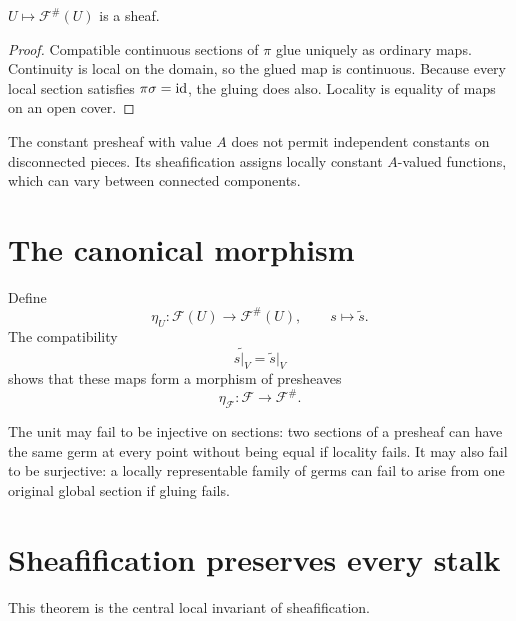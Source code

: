 

\begin{theorem}
$U\mapsto\mathcal F^\#(U)$ is a sheaf.
\end{theorem}
\begin{proof}
Compatible continuous sections of $\pi$ glue uniquely as ordinary maps.  Continuity is local
on the domain, so the glued map is continuous.  Because every local section satisfies
$\pi\sigma=\operatorname{id}$, the gluing does also.  Locality is equality of maps on an open cover.
\end{proof}

\begin{example}\label{ex:vi14-expand-01}
The constant presheaf with value $A$ does not permit independent constants on disconnected pieces.  Its sheafification assigns locally constant $A$-valued functions, which can vary between connected components.
\end{example}
\section{The canonical morphism}

Define
\[
\eta_U:\mathcal F(U)\longrightarrow\mathcal F^\#(U),
\qquad
s\longmapsto\widetilde s.
\]
The compatibility
\[
\widetilde{s|_V}=\widetilde s|_V
\]
shows that these maps form a morphism of presheaves
\[
\eta_{\mathcal F}:\mathcal F\longrightarrow\mathcal F^\#.
\]



The unit may fail to be injective on sections: two sections of a presheaf can have the same
germ at every point without being equal if locality fails.  It may also fail to be
surjective: a locally representable family of germs can fail to arise from one original
global section if gluing fails.

\section{Sheafification preserves every stalk}

This theorem is the central local invariant of sheafification.


